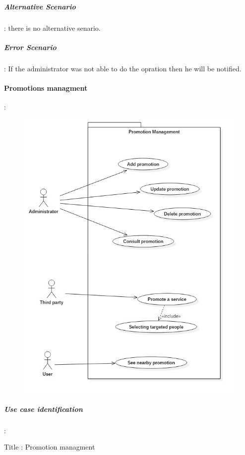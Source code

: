 \subparagraph{Alternative Scenario} :
\label{sec:sec01}
there is no alternative senario.
\subparagraph{Error Scenario} :
\label{sec:sec01}
If the administrator was not able to do the opration then he will be notified.

 \paragraph{Promotions managment} :
\label{sec:sec01}   

 \begin{figure}[H]
	\centering
	\includegraphics[height=0.4\textheight]{fig01/PromotionUseCaseDiagram}
	\label{fig:FilialesEtClients}
\end{figure}

\subparagraph{Use case identification} :
\label{sec:sec01} 

Title : Promotion managment

